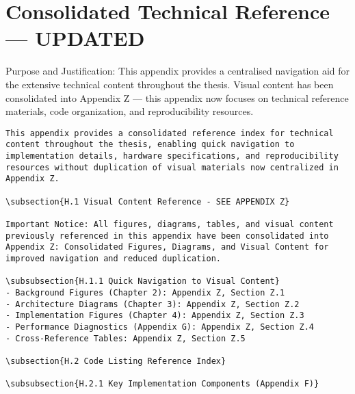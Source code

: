 \chapter{Consolidated Technical Reference — UPDATED}

Purpose and Justification: This appendix provides a centralised navigation aid for the extensive technical content throughout the thesis. Visual content has been consolidated into Appendix Z — this appendix now focuses on technical reference materials, code organization, and reproducibility resources.


\begin{verbatim}
This appendix provides a consolidated reference index for technical content throughout the thesis, enabling quick navigation to implementation details, hardware specifications, and reproducibility resources without duplication of visual materials now centralized in Appendix Z.

\subsection{H.1 Visual Content Reference - SEE APPENDIX Z}

Important Notice: All figures, diagrams, tables, and visual content previously referenced in this appendix have been consolidated into Appendix Z: Consolidated Figures, Diagrams, and Visual Content for improved navigation and reduced duplication.

\subsubsection{H.1.1 Quick Navigation to Visual Content}
- Background Figures (Chapter 2): Appendix Z, Section Z.1
- Architecture Diagrams (Chapter 3): Appendix Z, Section Z.2
- Implementation Figures (Chapter 4): Appendix Z, Section Z.3
- Performance Diagnostics (Appendix G): Appendix Z, Section Z.4
- Cross-Reference Tables: Appendix Z, Section Z.5

\subsection{H.2 Code Listing Reference Index}

\subsubsection{H.2.1 Key Implementation Components (Appendix F)}


\end{verbatim}
